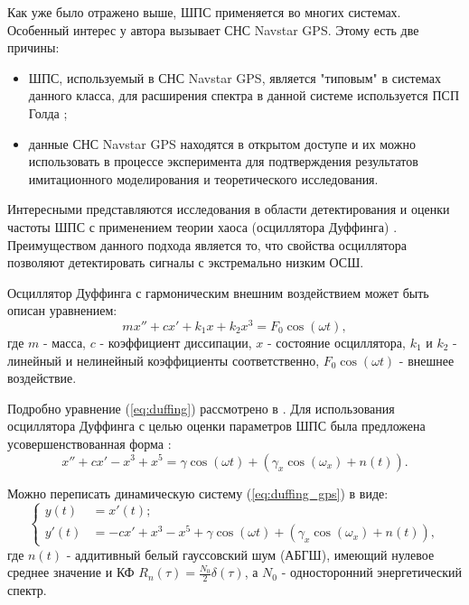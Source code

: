 Как уже было отражено выше, ШПС применяется во многих системах. Особенный интерес у автора вызывает СНС Navstar GPS. Этому есть две причины:
\begin{itemize}
	\item ШПС, используемый в СНС Navstar GPS, является "типовым" в системах данного класса, для расширения спектра в данной системе используется ПСП Голда \cite{gold-ieee};
	\item данные СНС Navstar GPS находятся в открытом доступе и их можно использовать в процессе эксперимента для подтверждения результатов имитационного
		моделирования и теоретического исследования.
\end{itemize}

Интересными представляются исследования в области детектирования и оценки
частоты ШПС с применением теории хаоса (осциллятора Дуффинга) \cite{chaos_cambridge, chaos_chen, chaos_huang, chaos_wang}. Преимуществом
данного подхода является то, что свойства осциллятора позволяют детектировать сигналы с экстремально низким ОСШ.

Осциллятор Дуффинга \cite{kobilkina_phd, sidorkina_phd, rukovica_phd} с гармоническим внешним воздействием может быть описан уравнением:
\begin{equation}
	\label{eq:duffing}
	mx'' + cx' + k_{1}x + k_{2}x^3 = F_{0}\cos(\omega{t}),
\end{equation}
где $m$ - масса, $c$ - коэффициент диссипации, $x$ - состояние осциллятора, $k_1$ и $k_2$ - линейный и нелинейный коэффициенты соответственно,
$F_{0}\cos(\omega{t})$ - внешнее воздействие.

Подробно уравнение (\ref{eq:duffing}) рассмотрено в \cite{chaos_neimark_landa}.
Для использования осциллятора Дуффинга с целью оценки параметров ШПС была предложена усовершенствованная форма \cite{chaos_song, chaos_chen}:
\begin{equation}
	\label{eq:duffing_gps}
	x'' +cx' - x^3 + x^5 = \gamma\cos(\omega{t}) + (\gamma_{x}\cos(\omega_{x}) + n(t)).
\end{equation}

Можно переписать динамическую систему (\ref{eq:duffing_gps}) в виде:
\begin{equation}
	\label{eq:duffing_gps_2}
	\left\{
	\begin{aligned}
		y(t) & = x'(t); \\
		y'(t) & =  -cx' + x^3 - x^5 + \gamma\cos(\omega{t}) + (\gamma_{x}\cos(\omega_{x}) + n(t)),
	\end{aligned}
	\right.
\end{equation}
где ${n(t)}$ - аддитивный белый гауссовский шум (АБГШ), имеющий нулевое среднее  значение и КФ ${R_n(\tau) = \frac{N_0}{2} \delta(\tau)}$,
а ${N_0}$ - односторонний энергетический спектр.

